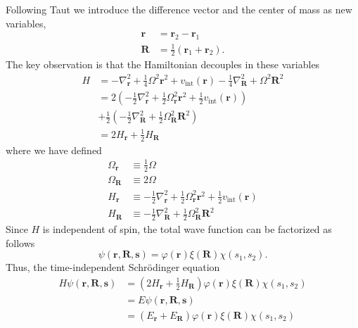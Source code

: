 \documentclass[aip,jcp,reprint,floatfix]{revtex4-1}
\begin{document}
\begin{appendices}
Following Taut \cite{Taut93} we introduce the difference vector and the center of mass as new variables,
\begin{align}
    \mathbf{r} &= \mathbf{r}_2-\mathbf{r}_1 \\
    \mathbf{R} &= \frac{1}{2} \left( \mathbf{r}_1+\mathbf{r}_2 \right). 
\end{align}
The key observation is that the Hamiltonian decouples in these variables
\begin{align}
    H &= - \nabla_\mathbf{r}^2 + \frac{1}{4} \Omega^2 \mathbf{r}^2 + v_{\text{int}}(\mathbf{r})  - \frac{1}{4}\nabla_\mathbf{R}^2 + \Omega^2 \mathbf{R}^2 \nonumber \\
    &= 2 \left( -\frac{1}{2} \nabla_\mathbf{r}^2 + \frac{1}{2} \Omega_\mathbf{r}^2 \mathbf{r}^2 + \frac{1}{2}v_{\text{int}}(\mathbf{r}) \right) \nonumber \\  &+ \frac{1}{2} \left( -\frac{1}{2}\nabla_\mathbf{R}^2 + \frac{1}{2}\Omega_\mathbf{R}^2 \mathbf{R}^2 \right) \nonumber \\
    &= 2 H_\mathbf{r} + \frac{1}{2}H_\mathbf{R} 
\end{align}
where we have defined 
\begin{align}
    \Omega_\mathbf{r} &\equiv \frac{1}{2}\Omega \\
    \Omega_\mathbf{R} &\equiv 2 \Omega \\
    H_\mathbf{r} &\equiv -\frac{1}{2} \nabla_\mathbf{r}^2   + \frac{1}{2} \Omega_\mathbf{r}^2 \mathbf{r}^2 + \frac{1}{2}v_{\text{int}}(\mathbf{r}) \\
    H_\mathbf{R} &\equiv -\frac{1}{2}\nabla_\mathbf{R}^2 + \frac{1}{2}\Omega_\mathbf{R}^2 \mathbf{R}^2
\end{align}
Since $H$ is independent of spin, the total wave function can be factorized as follows\cite{Taut93} 
\begin{equation}
    \psi(\mathbf{r},\mathbf{R},\mathbf{s}) = \varphi(\mathbf{r}) \xi(\mathbf{R}) \chi(s_1,s_2).
\end{equation}
Thus, the time-independent Schrödinger equation 
\begin{align}
    H\psi(\mathbf{r},\mathbf{R},\mathbf{s}) &= \left( 2 H_\mathbf{r} + \frac{1}{2}H_\mathbf{R} \right) \varphi(\mathbf{r}) \xi(\mathbf{R}) \chi(s_1,s_2) \\ 
    &= E\psi(\mathbf{r},\mathbf{R},\mathbf{s}) \\
    &= \left( E_\mathbf{r} + E_\mathbf{R} \right) \varphi(\mathbf{r}) \xi(\mathbf{R}) \chi(s_1,s_2)
\end{align}

\end{appendices}
\end{document}
